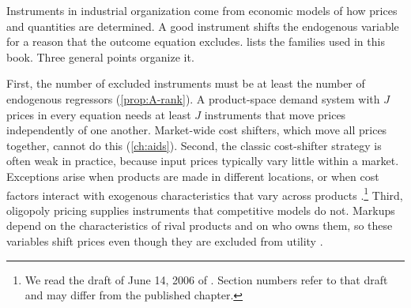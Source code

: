 Instruments in industrial organization come from economic models of how prices and quantities are determined.
A good instrument shifts the endogenous variable for a reason that the outcome equation excludes.
 lists the families used in this book. Three general points organize it.

First, the number of excluded instruments must be at least the number of endogenous regressors
(\cref{prop:A-rank}). A product-space demand system with $J$ prices in every equation needs at least $J$
instruments that move prices independently of one another. Market-wide cost shifters, which move all prices
together, cannot do this (\cref{ch:aids}). Second, the classic cost-shifter strategy is often weak in practice,
because input prices typically vary little within a market. Exceptions arise when products are made in
different locations, or when cost factors interact with exogenous characteristics that vary across products
\citep[Section~1.4.3]{AckerbergEtAl2007}.\footnote{We read the draft of June 14, 2006 of
\citet{AckerbergEtAl2007}. Section numbers refer to that draft and may differ from the published chapter.} Third, oligopoly pricing supplies instruments that competitive
models do not. Markups depend on the characteristics of rival products and on who owns them, so these
variables shift prices even though they are excluded from utility \citep{Bresnahan1987,BerryLevinsohnPakes1995}.

